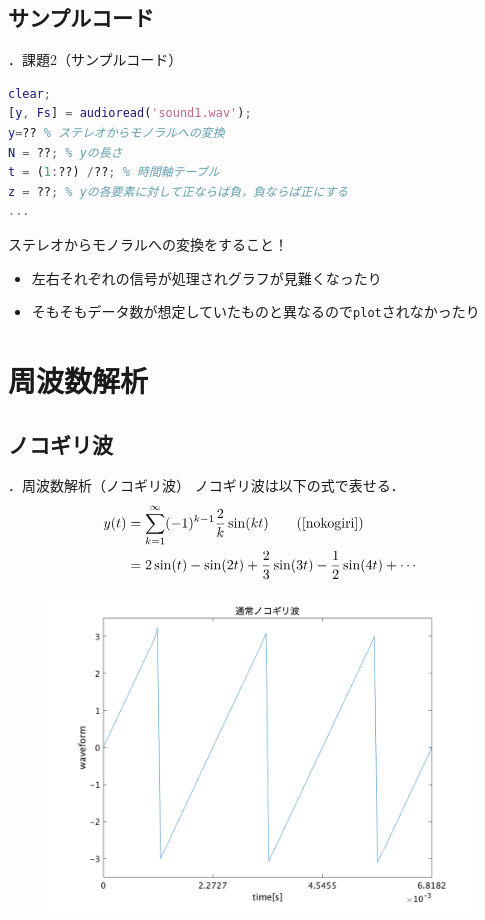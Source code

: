 \documentclass[aspectratio=43]{beamer}
\newcommand{\showsec}{\thesection ．}
\begin{document}
\subsection{サンプルコード}
\begin{frame}[t,containsverbatim]{\showsec 課題2（サンプルコード）}
    \begin{lstlisting}[language={Matlab}]
clear;
[y, Fs] = audioread('sound1.wav');
y=?? % ステレオからモノラルへの変換
N = ??; % yの長さ
t = (1:??) /??; % 時間軸テーブル
z = ??; % yの各要素に対して正ならば負，負ならば正にする
...
    \end{lstlisting}
    \begin{alertblock}{}
        ステレオからモノラルへの変換をすること！
        \begin{itemize}
            \item 左右それぞれの信号が処理されグラフが見難くなったり
            \item そもそもデータ数が想定していたものと異なるので\texttt{plot}されなかったり
        \end{itemize}
    \end{alertblock}
\end{frame}
\section{周波数解析}
\subsection{ノコギリ波}
\begin{frame}[t]{\showsec 周波数解析（ノコギリ波）}
    ノコギリ波は以下の式で表せる．
    \begin{align}
        y(t) & = \sum_{k=1}^{\infty}(-1)^{k-1}\dfrac{2}{k}\sin(kt)\tag{\ref{nokogiri}}    \\
             & = 2\sin(t) - \sin(2t) + \frac{2}{3}\sin(3t) - \frac{1}{2}\sin(4t) + \cdots
    \end{align}
    \begin{figure}
        \includegraphics[keepaspectratio,height=0.5\textheight]{nokogiri.png}
    \end{figure}
\end{frame}
\end{document}
